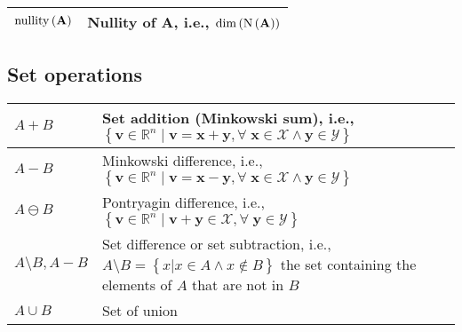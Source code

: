 \begin{xltabular}{\textwidth}{XX}
	\(\operatorname{nullity}\left(\mathbf{A}\right)\)                                                                                                                           & Nullity of \(\mathbf{A}\), i.e., \(\operatorname{dim}\left(\operatorname{N}\left(\mathbf{A}\right)\right)\)                                                                                                                                                                                             \\ \hline
\end{xltabular}

\subsection{Set operations}
\begin{xltabular}{\textwidth}{XX}
	\(A + B\)                           & Set addition (Minkowski sum), i.e., \(\left\{ \mathbf{v} \in \mathbb{R}^{n} \mid \mathbf{v} = \mathbf{x}+\mathbf{y}, \forall \; \mathbf{x} \in \mathcal{X} \wedge \mathbf{y} \in \mathcal{Y} \right\}\) \cite{kouvaritakisModelPredictiveControl2016}                                                                                             \\ \hline
	\(A - B\)                           & Minkowski difference, i.e., \(\left\{ \mathbf{v} \in \mathbb{R}^{n} \mid \mathbf{v} = \mathbf{x}-\mathbf{y}, \forall \; \mathbf{x} \in \mathcal{X} \wedge \mathbf{y} \in \mathcal{Y} \right\}\)                                                                                                                                                   \\ \hline
	\(A \ominus B\)                     & Pontryagin difference, i.e., \(\left\{ \mathbf{v} \in \mathbb{R}^{n} \mid \mathbf{v} + \mathbf{y} \in \mathcal{X} , \forall \; \mathbf{y} \in \mathcal{Y} \right\}\) \cite{kouvaritakisModelPredictiveControl2016}                                                                                                                                \\ \hline
	\(A \setminus B, A-B\)              & Set difference or set subtraction, i.e., \(A \setminus B = \left\{ x \vert x \in A \wedge x \not\in B \right\}\) the set containing the elements of \(A\) that are not in \(B\) \cite{rosenDiscreteMathematicsIts2011}                                                                                                                            \\ \hline
	\(A \cup B\)                        & Set of union                                                                                                                                                                                                                                                                                                                                      \\ \hline

\end{xltabular}
